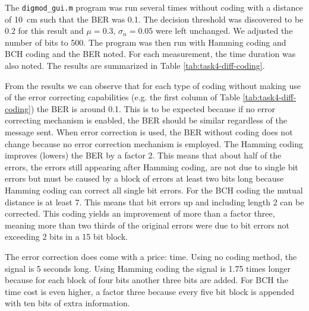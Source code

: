 \documentclass[11pt,titlepage]{report}
\begin{document}
The \texttt{digmod\_gui.m} program was run several times without coding with a distance of \SI{10}{\centi \meter} such that the BER was \num{0.1}. The decision threshold was discovered to be \num{0.2} for this result and $\mu=0.3$, $\sigma_n=0.05$ were left unchanged. We adjusted the number of bits to \num{500}. The program was then run with Hamming coding and BCH coding and the BER noted. For each measurement, the time duration was also noted. The results are summarized in Table \ref{tab:task4-diff-coding}.

From the results we can observe that for each type of coding without making use of the error correcting capabilities (e.g. the first column of Table \ref{tab:task4-diff-coding}) the BER is around \num{0.1}. This is to be expected because if no error correcting mechanism is enabled, the BER should be similar regardless of the message sent. When error correction is used, the BER without coding does not change because no error correction mechanism is employed. The Hamming coding improves (lowers) the BER by a factor \num{2}. This means that about half of the errors, the errors still appearing after Hamming coding, are not due to single bit errors but must be caused by a block of errors at least two bits long because Hamming coding can correct all single bit errors.
For the BCH coding the mutual distance is at least \num{7}. This means that bit errors up and including length \num{2} can be corrected. This coding yields an improvement of more than a factor three, meaning more than two thirds of the original errors were due to bit errors not exceeding \num{2} bits in a \num{15} bit block.

The error correction does come with a price: time. Using no coding method, the signal is \num{5} seconds long. Using Hamming coding the signal is \num{1.75} times longer because for each block of four bits another three bits are added. For BCH the time cost is even higher, a factor three because every five bit block is appended with ten bits of extra information.
\end{document}
